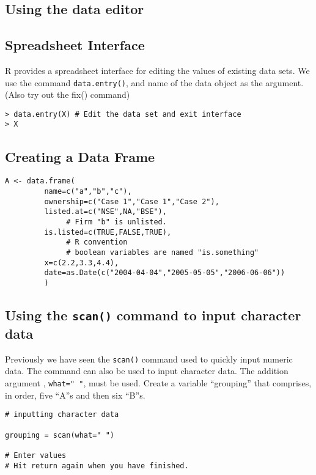 \documentclass[a4paper,12pt]{article}
\begin{document}
\subsection*{Using the data editor}
\subsection*{Spreadsheet Interface}
R provides a spreadsheet interface for editing the values of existing data sets. We use the
command \texttt{data.entry()}, and name of the data object as the argument. (Also try out the
fix() command)
\begin{framed}
\begin{verbatim}
> data.entry(X) # Edit the data set and exit interface
> X

\end{verbatim}
\end{framed}



\subsection*{Creating a Data Frame}
\begin{framed}
\begin{verbatim}
A <- data.frame(
         name=c("a","b","c"),
         ownership=c("Case 1","Case 1","Case 2"),
         listed.at=c("NSE",NA,"BSE"),
              # Firm "b" is unlisted.
         is.listed=c(TRUE,FALSE,TRUE),
              # R convention
              # boolean variables are named "is.something"
         x=c(2.2,3.3,4.4),
         date=as.Date(c("2004-04-04","2005-05-05","2006-06-06"))
         )
\end{verbatim}
\end{framed}

\subsection*{Using the \texttt{scan()} command to input character data}
Previously we have seen the \texttt{scan()} command used to quickly input numeric data. The command can also be used to input character data. The addition argument , \texttt{what=" "}, must be used.  
Create a variable “grouping” that comprises, in order,  five “A”s and then six “B”s.

\begin{verbatim}
# inputting character data

grouping = scan(what=" ")

# Enter values
# Hit return again when you have finished.

\end{verbatim}
\end{document}
